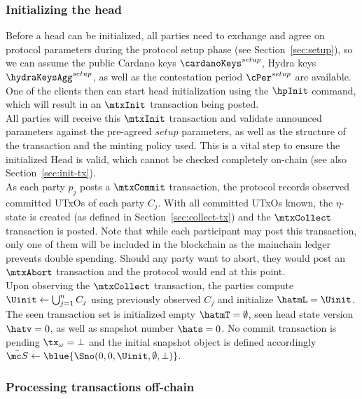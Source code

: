\subsubsection{Initializing the head}

\quad Before a head can be initialized, all parties need
to exchange and agree on protocol parameters during the protocol setup phase
(see Section~\ref{sec:setup}), so we can assume the public Cardano keys
$\cardanoKeys^{setup}$, Hydra keys $\hydraKeysAgg^{setup}$, as well as the
contestation period $\cPer^{setup}$ are available. One of the clients then can
start head initialization using the $\hpInit$ command, which will result in an
$\mtxInit$ transaction being posted. \\

\quad All parties will receive this $\mtxInit$
transaction and validate announced parameters against the pre-agreed $setup$
parameters, as well as the structure of the transaction and the minting policy
used. This is a vital step to ensure the initialized Head is valid, which
cannot be checked completely on-chain (see also Section~\ref{sec:init-tx}). \\

\quad As each party $p_{j}$ posts a
$\mtxCommit$ transaction, the protocol records observed committed UTxOs of each
party $C_j$. With all committed UTxOs known, the $\eta$-state is created (as
defined in Section~\ref{sec:collect-tx}) and the $\mtxCollect$ transaction is
posted. Note that while each participant may post this transaction, only one of
them will be included in the blockchain as the mainchain ledger prevents double
spending. Should any party want to abort, they would post an $\mtxAbort$
transaction and the protocol would end at this point.\\

\quad Upon observing the $\mtxCollect$
transaction, the parties compute $\Uinit \gets \bigcup_{j=1}^{n} C_j$ using previously
observed $C_j$ and initialize $\hatmL = \Uinit$. The seen transaction set is
initialized empty $\hatmT = \emptyset$, seen head state version $\hatv = 0$, as
well as snapshot number $\hats = 0$. No commit transaction is pending
$\tx_{\omega} = \bot$ and the initial snapshot object is defined accordingly
$\bar{\mc S} \gets \blue{\Sno(0, 0, \Uinit, \emptyset, \bot)}$.

\subsubsection{Processing transactions off-chain}

